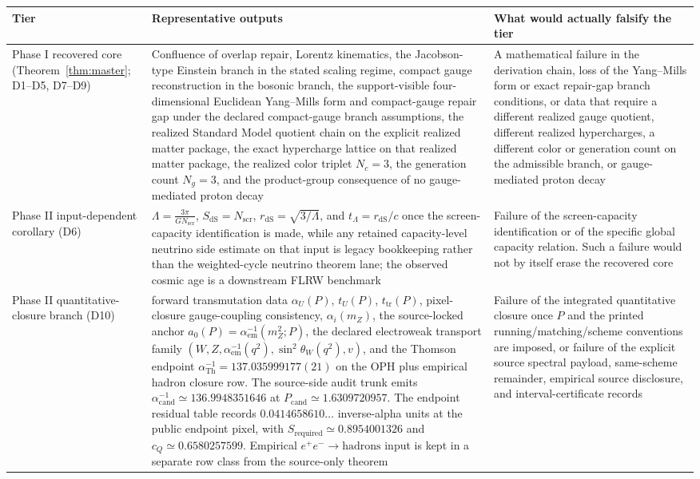 \documentclass[11pt]{article}
\begin{document}
\begingroup
\footnotesize
\begin{longtable}{@{}>{\raggedright\arraybackslash}p{}>{\raggedright\arraybackslash}p{}>{\raggedright\arraybackslash}p{}@{}}
\toprule
Tier & Representative outputs & What would actually falsify the tier \\
\midrule
\endhead
\bottomrule
\endfoot
Phase I recovered core (Theorem~\ref{thm:master}; D1--D5, D7--D9) & Confluence of overlap repair, Lorentz kinematics, the Jacobson-type Einstein branch in the stated scaling regime, compact gauge reconstruction in the bosonic branch, the support-visible four-dimensional Euclidean Yang--Mills form and compact-gauge repair gap under the declared compact-gauge branch assumptions, the realized Standard Model quotient chain on the explicit realized matter package, the exact hypercharge lattice on that realized matter package, the realized color triplet \(N_c=3\), the generation count \(N_g=3\), and the product-group consequence of no gauge-mediated proton decay & A mathematical failure in the derivation chain, loss of the Yang--Mills form or exact repair-gap branch conditions, or data that require a different realized gauge quotient, different realized hypercharges, a different color or generation count on the admissible branch, or gauge-mediated proton decay \\
Phase II input-dependent corollary (D6) & \(\Lambda=\frac{3\pi}{G N_{\mathrm{scr}}}\), \(S_{\mathrm{dS}}=N_{\mathrm{scr}}\), \(r_{\mathrm{dS}}=\sqrt{3/\Lambda}\), and \(t_\Lambda=r_{\mathrm{dS}}/c\) once the screen-capacity identification is made, while any retained capacity-level neutrino side estimate on that input is legacy bookkeeping rather than the weighted-cycle neutrino theorem lane; the observed cosmic age is a downstream FLRW benchmark & Failure of the screen-capacity identification or of the specific global capacity relation. Such a failure would not by itself erase the recovered core \\
Phase II quantitative-closure branch (D10) & forward transmutation data \(\alpha_U(P)\), \(t_U(P)\), \(t_{\mathrm{tr}}(P)\), pixel-closure gauge-coupling consistency, \(\alpha_i(m_Z)\), the source-locked anchor \(a_0(P)=\alpha_{\mathrm{em}}^{-1}(m_Z^2;P)\), the declared electroweak transport family \((W,Z,\alpha_{\mathrm{em}}^{-1}(q^2),\sin^2\theta_W(q^2),v)\), and the Thomson endpoint \(\alpha_{\mathrm{Th}}^{-1}=137.035999177(21)\) on the OPH plus empirical hadron closure row. The source-side audit trunk emits \(\alpha_{\mathrm{cand}}^{-1}\simeq136.9948351646\) at \(P_{\mathrm{cand}}\simeq1.6309720957\). The endpoint residual table records \(0.0414658610\ldots\) inverse-alpha units at the public endpoint pixel, with \(S_{\mathrm{required}}\simeq0.8954001326\) and \(c_Q\simeq0.6580257599\). Empirical \(e^+e^-\to\mathrm{hadrons}\) input is kept in a separate row class from the source-only theorem & Failure of the integrated quantitative closure once \(P\) and the printed running/matching/scheme conventions are imposed, or failure of the explicit source spectral payload, same-scheme remainder, empirical source disclosure, and interval-certificate records \\

\end{longtable}
\end{document}
